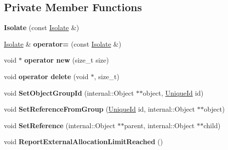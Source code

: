 \subsection*{Private Member Functions}
\begin{DoxyCompactItemize}
\item 
{\bfseries Isolate} (const \hyperlink{classv8_1_1_isolate}{Isolate} \&)\hypertarget{classv8_1_1_isolate_a979321fdbb883356189324cb273157b5}{}\label{classv8_1_1_isolate_a979321fdbb883356189324cb273157b5}

\item 
\hyperlink{classv8_1_1_isolate}{Isolate} \& {\bfseries operator=} (const \hyperlink{classv8_1_1_isolate}{Isolate} \&)\hypertarget{classv8_1_1_isolate_a6956413fd22aed96a31b8a5ffe075e62}{}\label{classv8_1_1_isolate_a6956413fd22aed96a31b8a5ffe075e62}

\item 
void $\ast$ {\bfseries operator new} (size\+\_\+t size)\hypertarget{classv8_1_1_isolate_a2e4a83509115f47018e9b24adb3496a6}{}\label{classv8_1_1_isolate_a2e4a83509115f47018e9b24adb3496a6}

\item 
void {\bfseries operator delete} (void $\ast$, size\+\_\+t)\hypertarget{classv8_1_1_isolate_a952adce6105528dff9fd48db6953a31a}{}\label{classv8_1_1_isolate_a952adce6105528dff9fd48db6953a31a}

\item 
void {\bfseries Set\+Object\+Group\+Id} (internal\+::\+Object $\ast$$\ast$object, \hyperlink{classv8_1_1_unique_id}{Unique\+Id} id)\hypertarget{classv8_1_1_isolate_a19de4baa103e8b7b4266fba9563e0634}{}\label{classv8_1_1_isolate_a19de4baa103e8b7b4266fba9563e0634}

\item 
void {\bfseries Set\+Reference\+From\+Group} (\hyperlink{classv8_1_1_unique_id}{Unique\+Id} id, internal\+::\+Object $\ast$$\ast$object)\hypertarget{classv8_1_1_isolate_ab3d68205008e21a4bdc5640cb313e6bd}{}\label{classv8_1_1_isolate_ab3d68205008e21a4bdc5640cb313e6bd}

\item 
void {\bfseries Set\+Reference} (internal\+::\+Object $\ast$$\ast$parent, internal\+::\+Object $\ast$$\ast$child)\hypertarget{classv8_1_1_isolate_ac3d2330d18a3aec1de8de6165364e685}{}\label{classv8_1_1_isolate_ac3d2330d18a3aec1de8de6165364e685}

\item 
void {\bfseries Report\+External\+Allocation\+Limit\+Reached} ()\hypertarget{classv8_1_1_isolate_a46368f020b87e91876ec06bfdb255911}{}\label{classv8_1_1_isolate_a46368f020b87e91876ec06bfdb255911}

\end{DoxyCompactItemize}
